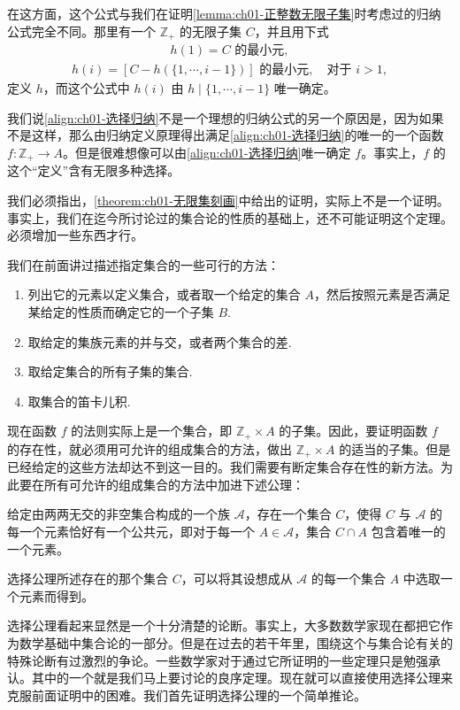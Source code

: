 \documentclass[../../main.tex]{subfiles}
\begin{document}
在这方面，这个公式与我们在证明\cref{lemma:ch01-正整数无限子集}时考虑过的归纳公式完全不同。那里有一个 $\mathbb{Z}_{+}$ 的无限子集 $C$，并且用下式
\begin{align*}
h(1) = C \text{ 的最小元},
\end{align*}
\begin{align*}
h(i) = [C - h(\{1, \cdots, i-1\})] \text{ 的最小元}, \quad \text{对于 } i > 1,
\end{align*}
定义 $h$，而这个公式中 $h(i)$ 由 $h \mid \{1, \cdots, i-1\}$ 唯一确定。

我们说\eqref{align:ch01-选择归纳}不是一个理想的归纳公式的另一个原因是，因为如果不是这样，那么由归纳定义原理得出满足\eqref{align:ch01-选择归纳}的唯一的一个函数 $f: \mathbb{Z}_{+} \longrightarrow A$。但是很难想像可以由\eqref{align:ch01-选择归纳}唯一确定 $f$。事实上，$f$ 的这个“定义”含有无限多种选择。

我们必须指出，\cref{theorem:ch01-无限集刻画}中给出的证明，实际上不是一个证明。事实上，我们在迄今所讨论过的集合论的性质的基础上，还不可能证明这个定理。必须增加一些东西才行。

我们在前面讲过描述指定集合的一些可行的方法：
\begin{enumerate}[(1)]
\item 列出它的元素以定义集合，或者取一个给定的集合 $A$，然后按照元素是否满足某给定的性质而确定它的一个子集 $B$.
\item 取给定的集族元素的并与交，或者两个集合的差.
\item 取给定集合的所有子集的集合.
\item 取集合的笛卡儿积.
\end{enumerate}

现在函数 $f$ 的法则实际上是一个集合，即 $\mathbb{Z}_{+} \times A$ 的子集。因此，要证明函数 $f$ 的存在性，就必须用可允许的组成集合的方法，做出 $\mathbb{Z}_{+} \times A$ 的适当的子集。但是已经给定的这些方法却达不到这一目的。我们需要有断定集合存在性的新方法。为此要在所有可允许的组成集合的方法中加进下述公理：

\begin{axiom}[选择公理]\label{axiom:ch01-选择公理}
给定由两两无交的非空集合构成的一个族 $\mathcal{A}$，存在一个集合 $C$，使得 $C$ 与 $\mathcal{A}$ 的每一个元素恰好有一个公共元，即对于每一个 $A \in \mathcal{A}$，集合 $C \cap A$ 包含着唯一的一个元素。
\end{axiom}

选择公理所述存在的那个集合 $C$，可以将其设想成从 $\mathcal{A}$ 的每一个集合 $A$ 中选取一个元素而得到。

选择公理看起来显然是一个十分清楚的论断。事实上，大多数数学家现在都把它作为数学基础中集合论的一部分。但是在过去的若干年里，围绕这个与集合论有关的特殊论断有过激烈的争论。一些数学家对于通过它所证明的一些定理只是勉强承认。其中的一个就是我们马上要讨论的良序定理。现在就可以直接使用选择公理来克服前面证明中的困难。我们首先证明选择公理的一个简单推论。
\end{document}
